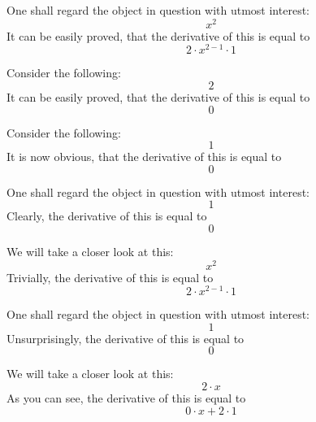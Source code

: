 \documentclass{article}
\begin{document}
One shall regard the object in question with utmost interest:
\begin{equation}
x ^{2 } 
\end{equation}
It can be easily proved, that the derivative of this is equal to
\begin{equation}
2 \cdot x ^{2 - 1 } \cdot 1 
\end{equation}

Consider the following:
\begin{equation}
2 
\end{equation}
It can be easily proved, that the derivative of this is equal to
\begin{equation}
0 
\end{equation}

Consider the following:
\begin{equation}
1 
\end{equation}
It is now obvious, that the derivative of this is equal to
\begin{equation}
0 
\end{equation}

One shall regard the object in question with utmost interest:
\begin{equation}
1 
\end{equation}
Clearly, the derivative of this is equal to
\begin{equation}
0 
\end{equation}

We will take a closer look at this:
\begin{equation}
x ^{2 } 
\end{equation}
Trivially, the derivative of this is equal to
\begin{equation}
2 \cdot x ^{2 - 1 } \cdot 1 
\end{equation}

One shall regard the object in question with utmost interest:
\begin{equation}
1 
\end{equation}
Unsurprisingly, the derivative of this is equal to
\begin{equation}
0 
\end{equation}

We will take a closer look at this:
\begin{equation}
2 \cdot x 
\end{equation}
As you can see, the derivative of this is equal to
\begin{equation}
0 \cdot x + 2 \cdot 1 
\end{equation}
\end{document}
